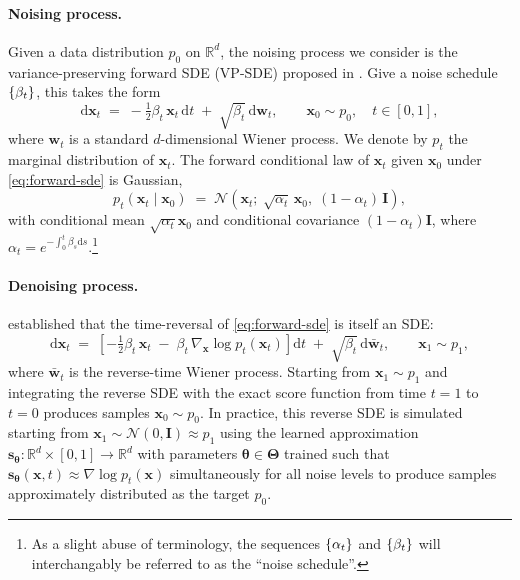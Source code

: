 \documentclass[11pt]{article}
\newcommand{\vect}[1]{\mathbf{#1}}
\theoremstyle{plain}
\newcommand{\1}{\mathbbm{1}}
\DeclarePairedDelimiter{\set}{\lbrace}{\rbrace}
\newcommand{\btheta}{{\boldsymbol{\theta}}}
\newcommand{\vx}{\vect{x}}
\newcommand{\vs}{\vect{s}}
\newcommand{\score}[2][]{\vect{s}_{#1}^{(#2)}}
\begin{document}
\paragraph{Noising process.} 
Given a data distribution $p_0$ on $\mathbb{R}^d$, the noising process we consider is the {variance-preserving forward SDE} (VP-SDE)  proposed in \citet{song2021scorebasedgenerativemodelingstochastic}. Give a noise schedule $\set{\beta_t}$, this takes the form 
\begin{equation}
    \mathrm{d}{\vx}_t 
    \;=\; 
    -\tfrac{1}{2} \beta_t \, {\vx}_t\, \mathrm{d}t \;+\; \sqrt{\beta_t}\,\mathrm{d}\vect{w}_t,
    \qquad {\vx}_0 \sim p_0,\quad t \in [0,1],
    \label{eq:forward-sde}
\end{equation}
where $\vect{w}_t$ is a standard $d$-dimensional Wiener process. We denote by $p_t$ the marginal distribution of ${\vx}_t$. The forward conditional law of ${\vx}_t$ given ${\vx}_0$ under \eqref{eq:forward-sde} is Gaussian, 
\begin{equation}
    p_t({\vx}_t \mid {\vx}_0) 
    \;=\; 
    \mathcal{N}\!\left(
    {\vx}_t;\; \sqrt{\alpha_t}\,{\vx}_0,\; (1-\alpha_t)\,\vect{I}
    \right),
   \label{eq:forward-kernel}
\end{equation}
with conditional mean $\sqrt{\alpha_t} {\vx}_0$ and conditional covariance $(1-\alpha_t) \vect{I}$, where $\alpha_t=e^{-\int_0^t\beta_s \mathrm{d}s}$.\footnote{As a slight abuse of terminology, the sequences $\set{\alpha_t}$ and $\set{\beta_t}$ will interchangably be referred to as the ``noise schedule''.} 

\paragraph{Denoising process.}
\citet{ANDERSON1982313} established that the time-reversal of \eqref{eq:forward-sde} is itself an SDE:
\begin{equation}
    \mathrm{d}{\vx}_t 
    \;=\; 
    \left[-\tfrac{1}{2}{\beta_t}\,{\vx}_t \;-\; {\beta_t}\,\nabla_{{\vx}} \log p_t({\vx}_t)\right]
    \mathrm{d}t 
    \;+\; 
    \sqrt{{\beta_t}}\,\mathrm{d}\bar{\vect{w}}_t,
    \qquad {\vx}_1 \sim p_1,
    \label{eq:reverse-sde}
\end{equation}
where $\bar{\vect{w}}_t$ is the reverse-time Wiener process. 
Starting from ${\vx}_1 \sim p_1$ and integrating the reverse SDE with the exact score function from time $t=1$ to $t=0$ produces samples ${\vx}_0 \sim p_0$.  In practice, this reverse SDE is simulated starting from ${\vx}_1 \sim \mathcal{N}(0,\mathbf{I}) \approx p_1$ using the learned approximation $\vs_{\btheta}: \mathbb{R}^d \times [0,1] \rightarrow \mathbb{R}^d$ with parameters $\btheta  \in \boldsymbol{\Theta}$ trained such that $\vs_{\btheta}({\vx},t) \approx \nabla \log p_t({\vx})$ simultaneously for all noise levels to produce samples approximately distributed as the target $p_0$. %
\end{document}
